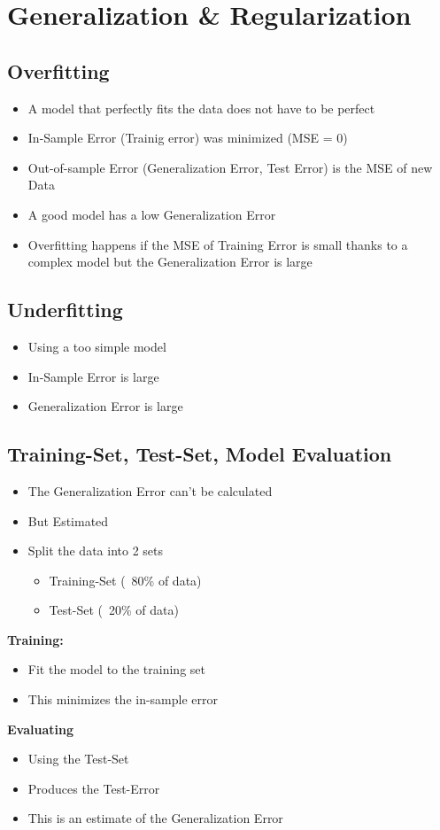 \section{Generalization \& Regularization}
\subsection{Overfitting}
\begin{itemize}
    \item A model that perfectly fits the data does not have to be perfect
    \item In-Sample Error (Trainig error) was minimized (MSE = 0)
    \item Out-of-sample Error (Generalization Error, Test Error) is the MSE of new Data
    \item A good model has a low Generalization Error
    \item Overfitting happens if the MSE of Training Error is small thanks to a complex model but the Generalization Error is large
\end{itemize}

\subsection{Underfitting}
\begin{itemize}
    \item Using a too simple model
    \item In-Sample Error is large
    \item Generalization Error is large
\end{itemize}


\subsection{Training-Set, Test-Set, Model Evaluation}
\begin{itemize}
    \item The Generalization Error can't be calculated
    \item But Estimated
    \item Split the data into 2 sets
    \begin{itemize}
        \item Training-Set (~80\% of data)
        \item Test-Set (~20\% of data)
    \end{itemize}
\end{itemize}
\textbf{Training:} 
\begin{itemize}
    \item Fit the model to the training set
    \item This minimizes the in-sample error
\end{itemize} 
\textbf{Evaluating}
\begin{itemize}
    \item Using the Test-Set
    \item Produces the Test-Error
    \item This is an estimate of the Generalization Error
\end{itemize}

